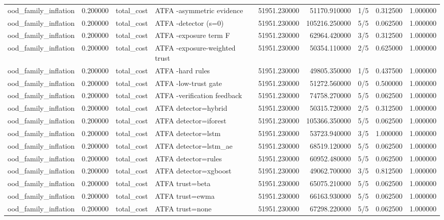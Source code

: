 \begin{tabular}{lrllrrlrr}
ood\_family\_inflation & 0.200000 & total\_cost & ATFA -asymmetric evidence & 51951.230000 & 51170.910000 & 1/5 & 0.312500 & 1.000000 \\
ood\_family\_inflation & 0.200000 & total\_cost & ATFA -detector (s=0) & 51951.230000 & 105216.250000 & 5/5 & 0.062500 & 1.000000 \\
ood\_family\_inflation & 0.200000 & total\_cost & ATFA -exposure term F & 51951.230000 & 62964.420000 & 3/5 & 0.312500 & 1.000000 \\
ood\_family\_inflation & 0.200000 & total\_cost & ATFA -exposure-weighted trust & 51951.230000 & 50354.110000 & 2/5 & 0.625000 & 1.000000 \\
ood\_family\_inflation & 0.200000 & total\_cost & ATFA -hard rules & 51951.230000 & 49805.350000 & 1/5 & 0.437500 & 1.000000 \\
ood\_family\_inflation & 0.200000 & total\_cost & ATFA -low-trust gate & 51951.230000 & 51272.560000 & 0/5 & 0.500000 & 1.000000 \\
ood\_family\_inflation & 0.200000 & total\_cost & ATFA -verification feedback & 51951.230000 & 74758.270000 & 5/5 & 0.062500 & 1.000000 \\
ood\_family\_inflation & 0.200000 & total\_cost & ATFA detector=hybrid & 51951.230000 & 50315.720000 & 2/5 & 0.312500 & 1.000000 \\
ood\_family\_inflation & 0.200000 & total\_cost & ATFA detector=iforest & 51951.230000 & 105366.350000 & 5/5 & 0.062500 & 1.000000 \\
ood\_family\_inflation & 0.200000 & total\_cost & ATFA detector=lstm & 51951.230000 & 53723.940000 & 3/5 & 1.000000 & 1.000000 \\
ood\_family\_inflation & 0.200000 & total\_cost & ATFA detector=lstm\_ae & 51951.230000 & 68519.120000 & 5/5 & 0.062500 & 1.000000 \\
ood\_family\_inflation & 0.200000 & total\_cost & ATFA detector=rules & 51951.230000 & 60952.480000 & 5/5 & 0.062500 & 1.000000 \\
ood\_family\_inflation & 0.200000 & total\_cost & ATFA detector=xgboost & 51951.230000 & 49062.700000 & 3/5 & 0.812500 & 1.000000 \\
ood\_family\_inflation & 0.200000 & total\_cost & ATFA trust=beta & 51951.230000 & 65075.210000 & 5/5 & 0.062500 & 1.000000 \\
ood\_family\_inflation & 0.200000 & total\_cost & ATFA trust=ewma & 51951.230000 & 66163.930000 & 5/5 & 0.062500 & 1.000000 \\
ood\_family\_inflation & 0.200000 & total\_cost & ATFA trust=none & 51951.230000 & 67298.220000 & 5/5 & 0.062500 & 1.000000 \\

\end{tabular}
